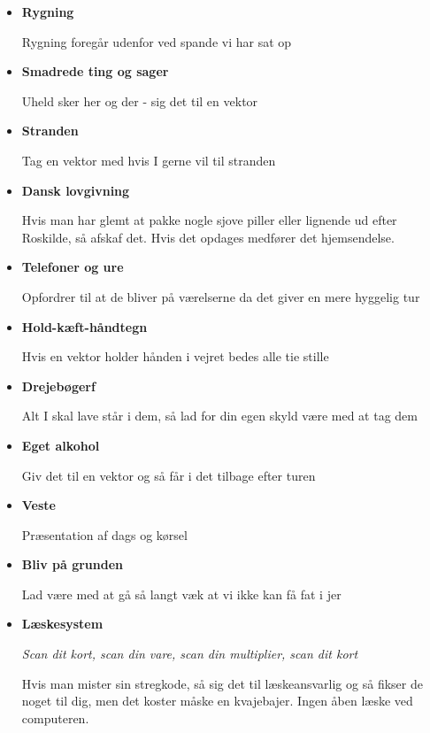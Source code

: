 \documentclass[../../../main.tex]{subfiles}
\begin{document}
\begin{itemize}
    \item \textbf{Rygning}
    
    Rygning foregår udenfor ved spande vi har sat op
    
    \item \textbf{Smadrede ting og sager}
    
    Uheld sker her og der - sig det til en vektor
    
    \item \textbf{Stranden}
    
    Tag en vektor med hvis I gerne vil til stranden
    
    \item \textbf{Dansk lovgivning}
    
    Hvis man har glemt at pakke nogle sjove piller eller lignende ud efter Roskilde, så afskaf det. Hvis det opdages medfører det hjemsendelse.
    
    
    \item \textbf{Telefoner og ure}
    
    Opfordrer til at de bliver på værelserne da det giver en mere hyggelig tur
    
    
    \item \textbf{Hold-kæft-håndtegn}
    
    Hvis en vektor holder hånden i vejret bedes alle tie stille
    
    
    \item \textbf{Drejebøgerf}
    
    Alt I skal lave står i dem, så lad for din egen skyld være med at tag dem
    
    
    \item \textbf{Eget alkohol}
    
    Giv det til en vektor og så får i det tilbage efter turen
    
    
    \item \textbf{Veste}
    
    Præsentation af dags og kørsel
    
    \item \textbf{Bliv på grunden}
    
    Lad være med at gå så langt væk at vi ikke kan få fat i jer
    
    
    \item \textbf{Læskesystem}
    
    \textit{Scan dit kort, scan din vare, scan din multiplier, scan dit kort}
    
    Hvis man mister sin stregkode, så sig det til læskeansvarlig og så fikser de noget til dig, men det koster måske en kvajebajer. Ingen åben læske ved computeren.
\end{itemize}
\end{document}
